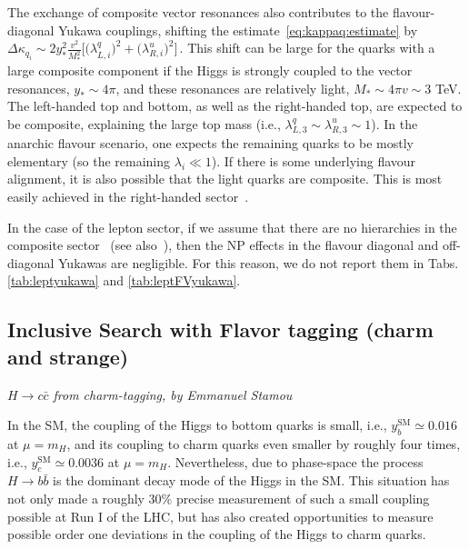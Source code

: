 \documentclass[../report.tex]{subfiles}
\begin{document}
The exchange of composite vector resonances also contributes to the
flavour-diagonal Yukawa couplings, shifting the
estimate~\eqref{eq:kappaq:estimate} by 
$\Delta \kappa_{q_i}\sim 2 y_*^2 \frac{v^2}{M_*^2}
\Big[\big(\lambda_{L,i}^q\big)^2+ \big(\lambda_{R,i}^u\big)^2\Big] \,$.
This shift can be large for the quarks with a large composite
component if the Higgs is strongly coupled to the vector resonances,
$y_*\sim 4\pi$, and these resonances are relatively light, $M_*\sim
4\pi v\sim 3$ TeV. The left-handed top and bottom, as well as the
right-handed top, are expected to be composite, explaining the large
top mass (i.e., $\lambda_{L,3}^q\sim \lambda_{R,3}^u\sim 1$). In the
anarchic flavour scenario, one expects the remaining quarks to be
mostly elementary (so the remaining $\lambda_i\ll 1$).  
If there is some underlying flavour alignment, it is also possible that
the light quarks are composite. This is most easily achieved in the
right-handed sector~\cite{Redi:2011zi, Redi:2012uj,
  Delaunay:2013iia}.

In the case of the lepton sector, if we assume that there are no
hierarchies in the composite sector~\cite{Redi:2013pga} (see also~\cite{Csaki:2008qq,delAguila:2010vg,Hagedorn:2011un,Hagedorn:2011pw}), then the NP
effects in the flavour diagonal and off-diagonal Yukawas are
negligible. For this reason, we do not report them in Tabs. \ref{tab:leptyukawa} and \ref{tab:leptFVyukawa}.




\subsection{Inclusive Search with Flavor tagging (charm and strange)}

\begin{center}{\emph{$H \rightarrow c \bar{c}$ from charm-tagging, by Emmanuel Stamou}} \end{center}

In the SM, the coupling of the Higgs to bottom quarks is small, i.e.,
$y_b^{\text{SM}}\simeq 0.016$ at $\mu=m_H$, and 
its coupling to charm quarks even smaller by roughly four times,
i.e., $y_c^{\text{SM}}\simeq 0.0036$ at $\mu=m_H$.
Nevertheless, due to phase-space the process $H\to b\bar b$ is the dominant 
decay mode of the Higgs in the SM.
This situation has not only made a roughly $30\%$ precise measurement of such 
a small coupling possible at Run I of the LHC, but has also created 
opportunities to measure possible order one deviations in the 
coupling of the Higgs to charm quarks.
\end{document}
